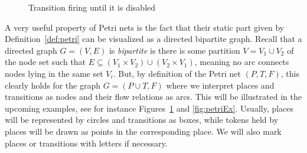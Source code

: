 \documentclass[
  paper=a4,
  titlepage,
  bibliography=totoc,
  pagesize=pdftex
]{scrartcl}
\numberwithin{figure}{section}
\numberwithin{equation}{section}
\numberwithin{table}{section}
\newcommand*\dotcup{\mathbin{\dot{\cup}}}
\theoremstyle{definition}
\numberwithin{definition}{section}
\begin{document}
\begin{figure}[htbp]
  \centering
  \caption{Transition firing until it is disabled}
  \label{fig:firing}
\end{figure}

A very useful property of Petri nets is the fact that their static part given by
Definition~\ref{def:petri} can be visualized as a directed bipartite graph. Recall that a
directed graph $G = (V,E)$ is \emph{bipartite} is there is some partition $V = V_1 \dotcup
V_2$ of the node set such that $E \subseteq (V_1 \times V_2) \cup (V_2 \times V_1)$,
meaning no arc connects nodes lying in the same set $V_i$. But, by definition of the Petri
net $(P,T,F)$, this clearly holds for the graph $G = (P \cup T, F)$ where we interpret
places and transitions as nodes and their flow relations as arcs. This will be illustrated
in the upcoming examples, see for instance Figures~\ref{fig:firing} and \ref{fig:petriEx}.
Usually, places will be represented by circles and transitions as boxes, while tokens held
by places will be drawn as points in the corresponding place. We will also mark places or
transitions with letters if necessary.
\end{document}
